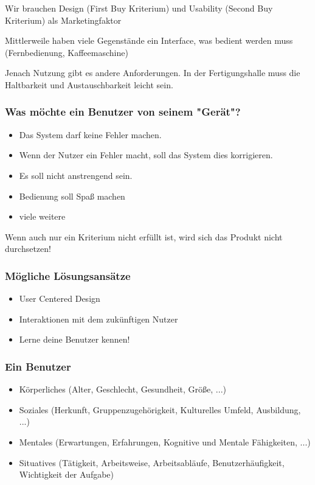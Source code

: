 \documentclass[a4paper]{article}
\begin{document}
Wir brauchen Design (First Buy Kriterium) und Usability (Second Buy Kriterium) als Marketingfaktor

Mittlerweile haben viele Gegenstände ein Interface, was bedient werden muss (Fernbedienung, Kaffeemaschine)

Jenach Nutzung gibt es andere Anforderungen. In der Fertigungshalle muss die Haltbarkeit und Austauschbarkeit leicht sein.

\subsubsection{Was möchte ein Benutzer von seinem "Gerät"?}

\begin{itemize}
    \item Das System darf keine Fehler machen.
    \item Wenn der Nutzer ein Fehler macht, soll das System dies korrigieren.
    \item Es soll nicht anstrengend sein.
    \item Bedienung soll Spaß machen
    \item viele weitere
\end{itemize}

Wenn auch nur ein Kriterium nicht erfüllt ist, wird sich das Produkt nicht durchsetzen!

\subsubsection{Mögliche Lösungsansätze}

\begin{itemize}
    \item User Centered Design
    \item Interaktionen mit dem zukünftigen Nutzer
    \item Lerne deine Benutzer kennen!
\end{itemize}

\subsubsection{Ein Benutzer}

\begin{itemize}
    \item Körperliches (Alter, Geschlecht, Gesundheit, Größe, ...)
    \item Soziales (Herkunft, Gruppenzugehörigkeit, Kulturelles Umfeld, Ausbildung, ...)
    \item Mentales (Erwartungen, Erfahrungen, Kognitive und Mentale Fähigkeiten, ...)
    \item Situatives (Tätigkeit, Arbeitsweise, Arbeitsabläufe, Benutzerhäufigkeit, Wichtigkeit der Aufgabe)
\end{itemize}
\end{document}
